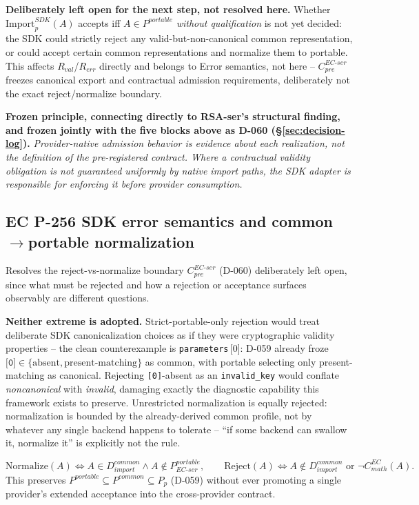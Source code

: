 \documentclass[11pt,a4paper]{article}
\begin{document}
\textbf{Deliberately left open for the next step, not resolved here.} Whether $\text{Import}_p^{SDK}(A)$ accepts iff $A\in P^{portable}$ \emph{without qualification} is not yet decided: the SDK could strictly reject any valid-but-non-canonical common representation, or could accept certain common representations and normalize them to portable. This affects $R_{val}$/$R_{err}$ directly and belongs to Error semantics, not here -- $C_{pre}^{EC\text{-}ser}$ freezes canonical export and contractual admission requirements, deliberately not the exact reject/normalize boundary.

\textbf{Frozen principle, connecting directly to RSA-ser's structural finding, and frozen jointly with the five blocks above as \textbf{D-060} (\S\ref{sec:decision-log}).} \emph{Provider-native admission behavior is evidence about each realization, not the definition of the pre-registered contract. Where a contractual validity obligation is not guaranteed uniformly by native import paths, the SDK adapter is responsible for enforcing it before provider consumption.}

\subsection{EC P-256 SDK error semantics and common\texorpdfstring{$\to$}{->}portable normalization}\label{sec:ec-ser-errors}

Resolves the reject-vs-normalize boundary $C_{pre}^{EC\text{-}ser}$ (D-060) deliberately left open, since what must be rejected and how a rejection or acceptance surfaces observably are different questions.

\textbf{Neither extreme is adopted.} Strict-portable-only rejection would treat deliberate SDK canonicalization choices as if they were cryptographic validity properties -- the clean counterexample is \texttt{parameters}\,[0]: D-059 already froze $\texttt{[0]}\in\{\text{absent},\text{present-matching}\}$ as common, with portable selecting only present-matching as canonical. Rejecting \texttt{[0]}-absent as an \texttt{invalid\_key} would conflate \emph{noncanonical} with \emph{invalid}, damaging exactly the diagnostic capability this framework exists to preserve. Unrestricted normalization is equally rejected: normalization is bounded by the already-derived common profile, not by whatever any single backend happens to tolerate -- ``if some backend can swallow it, normalize it'' is explicitly not the rule.

\[
\text{Normalize}(A) \iff A\in D_{import}^{common} \wedge A\notin P_{EC\text{-}ser}^{portable}, \qquad \text{Reject}(A) \iff A\notin D_{import}^{common} \text{ or } \neg C_{math}^{EC}(A).
\]
This preserves $P^{portable}\subseteq P^{common}\subseteq P_p$ (D-059) without ever promoting a single provider's extended acceptance into the cross-provider contract.
\end{document}
